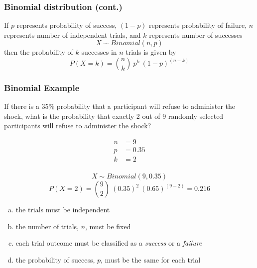 \documentclass[slidestop,compress,mathserif]{beamer}
\begin{document}

\begin{frame}
\frametitle{Binomial distribution (cont.)}

{
If $p$ represents probability of success, $(1-p)$ represents probability of failure, $n$ represents number of independent trials, and $k$ represents number of successes 
\[X\sim Binomial(n, p)\]
then the probability of $k$ successes in $n$ trials is given by
\[P(X=k) = {n \choose k}~p^k~(1-p)^{(n-k)} \]
} 

\end{frame}


\begin{frame}
\frametitle{Binomial Example}
If there is a 35\% probability that a participant will refuse to administer the shock, what is the probability that exactly 2 out of 9 randomly selected participants will refuse to administer the shock?

\pause

\begin{align*}
n&=9  \\
p&=0.35 \\
k&=2 \\
\end{align*}

\pause

\[X\sim Binomial(9, 0.35)\]
\[P(X=2) = {9 \choose 2}~(0.35)^2~(0.65)^{(9-2)} = 0.216\]

\end{frame}

\begin{frame}


\begin{enumerate}[(a)]
\item the trials must be independent
\item the number of trials, $n$, must be fixed
\item each trial outcome must be classified as a \textit{success} or a \textit{failure}
\item the probability of success, $p$, must be the same for each trial
\end{enumerate}

\end{frame}
\end{document}
